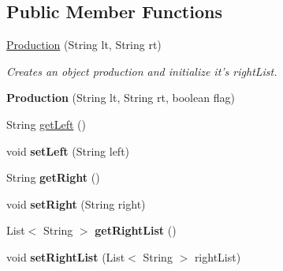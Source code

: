 \subsection*{Public Member Functions}
\begin{DoxyCompactItemize}
\item 
\hyperlink{classcontext_free_1_1grammar_1_1_production_a1db3c4e260abdcac50a8425cc9bd901f}{Production} (String lt, String rt)
\begin{DoxyCompactList}\small\item\em Creates an object production and initialize it's right\-List. \end{DoxyCompactList}\item 
\hypertarget{classcontext_free_1_1grammar_1_1_production_abc6df7181791245b8c3bf38871bc38b8}{{\bfseries Production} (String lt, String rt, boolean flag)}\label{classcontext_free_1_1grammar_1_1_production_abc6df7181791245b8c3bf38871bc38b8}

\item 
String \hyperlink{classcontext_free_1_1grammar_1_1_production_a6b42819c4b8af1aa759edf3ad5978f67}{get\-Left} ()
\item 
\hypertarget{classcontext_free_1_1grammar_1_1_production_a6a9e81d7a3445993afd077cfc4d21a12}{void {\bfseries set\-Left} (String left)}\label{classcontext_free_1_1grammar_1_1_production_a6a9e81d7a3445993afd077cfc4d21a12}

\item 
\hypertarget{classcontext_free_1_1grammar_1_1_production_a0b6496bc60eefe88fd4652a6f01ec15e}{String {\bfseries get\-Right} ()}\label{classcontext_free_1_1grammar_1_1_production_a0b6496bc60eefe88fd4652a6f01ec15e}

\item 
\hypertarget{classcontext_free_1_1grammar_1_1_production_aa36b86719aaccecb3c90a492c0d766e3}{void {\bfseries set\-Right} (String right)}\label{classcontext_free_1_1grammar_1_1_production_aa36b86719aaccecb3c90a492c0d766e3}

\item 
\hypertarget{classcontext_free_1_1grammar_1_1_production_ae712218305325e3649fa26989db291de}{List$<$ String $>$ {\bfseries get\-Right\-List} ()}\label{classcontext_free_1_1grammar_1_1_production_ae712218305325e3649fa26989db291de}

\item 
\hypertarget{classcontext_free_1_1grammar_1_1_production_a84c7fa859310c752fa76fb1ecc3fedba}{void {\bfseries set\-Right\-List} (List$<$ String $>$ right\-List)}\label{classcontext_free_1_1grammar_1_1_production_a84c7fa859310c752fa76fb1ecc3fedba}


\end{DoxyCompactItemize}
